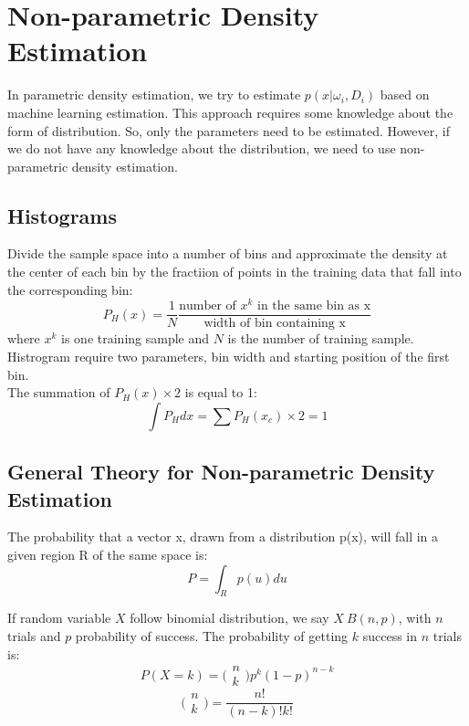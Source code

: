 \chapter{Non-parametric Density Estimation}

\begin{multicols*}{2}
\noindent In parametric density estimation, we try to estimate $p(x|\omega_i, D_i)$ based on machine learning estimation. This approach requires some knowledge about the form of distribution. So, only the parameters need to be estimated. However, if we do not have any knowledge about the distribution, we need to use non-parametric density estimation. 

\section{Histograms}

\noindent Divide the sample space into a number of bins and approximate the density at the center of each bin by the fractiion of points in the training data that fall into the corresponding bin:
$$P_H(x) = \frac{1}{N} \frac{\text{number of } x^k \text{ in the same bin as x}}{\text{width of bin containing x}}$$
\noindent where $x^k$ is one training sample and $N$ is the number of training sample. \\

\noindent Histrogram require two parameters, bin width and starting position of the first bin. \\

\noindent The summation of $P_H(x) \times 2$ is equal to 1:
$$\int P_H dx = \sum P_H(x_c) \times 2 = 1$$ 
\section{General Theory for Non-parametric Density Estimation}

\noindent The probability that a vector x, drawn from a distribution p(x), will fall in a given region R of the same space is:
$$P=\int_R p(u) du$$

\noindent If random variable $X$ follow binomial distribution, we say $X ~ B(n, p)$, with $n$ trials and $p$ probability of success. The probability of getting $k$ success in $n$ trials is:
$$P(X=k) = \bigg( \begin{matrix} n \\ k \end{matrix}\bigg) p^k (1-p)^{n-k}$$
$$\bigg( \begin{matrix} n \\ k \end{matrix}\bigg) = \frac{n!}{(n-k)!k!}$$


\end{multicols*}
